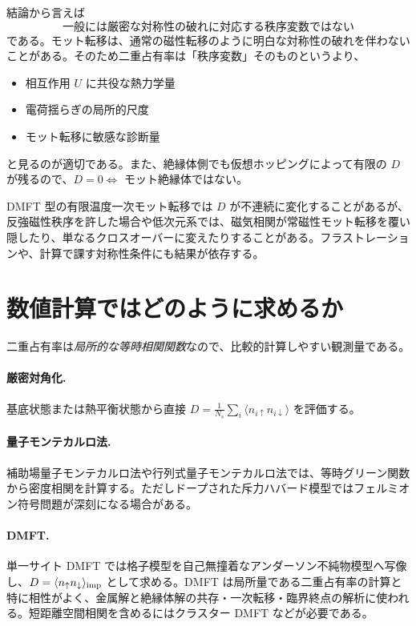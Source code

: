 \documentclass[11pt,a4paper]{ltjsarticle}
\newcommand{\ev}[1]{\langle #1\rangle}
\newcommand{\up}{\uparrow}
\newcommand{\dn}{\downarrow}
\begin{document}
結論から言えば
\begin{equation}
  \boxed{\ \text{一般には厳密な対称性の破れに対応する秩序変数ではない}\ }
\end{equation}
である。モット転移は、通常の磁性転移のように明白な対称性の破れを伴わないことがある。そのため二重占有率は「秩序変数」そのものというより、
\begin{itemize}
  \item 相互作用 $U$ に共役な熱力学量
  \item 電荷揺らぎの局所的尺度
  \item モット転移に敏感な診断量
\end{itemize}
と見るのが適切である。また、絶縁体側でも仮想ホッピングによって有限の $D$ が残るので、$D=0\Leftrightarrow$ モット絶縁体ではない。

DMFT 型の有限温度一次モット転移では $D$ が不連続に変化することがあるが、反強磁性秩序を許した場合や低次元系では、磁気相関が常磁性モット転移を覆い隠したり、単なるクロスオーバーに変えたりすることがある。フラストレーションや、計算で課す対称性条件にも結果が依存する。

\section{数値計算ではどのように求めるか}

二重占有率は\emph{局所的な等時相関関数}なので、比較的計算しやすい観測量である。

\paragraph{厳密対角化.}基底状態または熱平衡状態から直接 $D=\frac{1}{N_s}\sum_i\ev{n_{i\up}n_{i\dn}}$ を評価する。

\paragraph{量子モンテカルロ法.}補助場量子モンテカルロ法や行列式量子モンテカルロ法では、等時グリーン関数から密度相関を計算する。ただしドープされた斥力ハバード模型ではフェルミオン符号問題が深刻になる場合がある。

\paragraph{DMFT.}単一サイト DMFT では格子模型を自己無撞着なアンダーソン不純物模型へ写像し、$D=\ev{n_\up n_\dn}_{\rm imp}$ として求める。DMFT は局所量である二重占有率の計算と特に相性がよく、金属解と絶縁体解の共存・一次転移・臨界終点の解析に使われる。短距離空間相関を含めるにはクラスター DMFT などが必要である。
\end{document}

